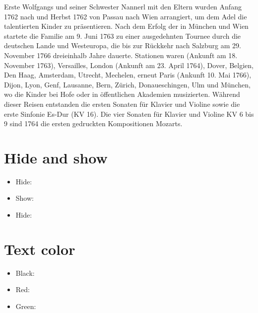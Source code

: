\documentclass{article}
\begin{document}
Erste  Wolfgangs und seiner Schwester Nannerl mit
den Eltern wurden Anfang 1762 nach  und Herbst 1762 von
Passau nach Wien arrangiert, um dem Adel die talentierten Kinder zu
präsentieren. Nach dem Erfolg der  in
München und Wien startete die Familie am 9. Juni 1763 zu einer
ausgedehnten Tournee durch die deutschen Lande und Westeuropa, die bis
zur Rückkehr nach Salzburg am 29. November 1766 dreieinhalb Jahre
dauerte. Stationen waren  (Ankunft am 18. November 1763), Versailles,
London (Ankunft am 23. April 1764), Dover, Belgien, Den Haag, Amsterdam,
Utrecht, Mechelen, erneut Paris (Ankunft 10. Mai 1766), Dijon, Lyon,
Genf, Lausanne, Bern, Zürich, Donaueschingen, Ulm und München, wo die
Kinder bei Hofe oder in öffentlichen Akademien musizierten. Während
dieser Reisen entstanden die ersten Sonaten für Klavier und Violine
sowie die erste Sinfonie Es-Dur (KV 16). Die vier Sonaten für Klavier
und Violine KV 6 bis 9 sind 1764 die ersten gedruckten Kompositionen
Mozarts.

\section{Hide and show}

\begin{itemize}
\item Hide: 
\item Show: 
\item Hide: 
\end{itemize}

\section{Text color}

\begin{itemize}
\item Black: 
\item Red: 
\item Green: 
\end{itemize}
\end{document}
